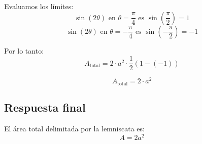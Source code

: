 Evaluamos los límites:
\[
\sin(2\theta) \text{ en } \theta = \frac{\pi}{4} \text{ es } \sin\left(\frac{\pi}{2}\right) = 1
\]
\[
\sin(2\theta) \text{ en } \theta = -\frac{\pi}{4} \text{ es } \sin\left(-\frac{\pi}{2}\right) = -1
\]

Por lo tanto:
\[
A_{\text{total}} = 2 \cdot a^2 \cdot \frac{1}{2} \left(1 - (-1)\right)
\]

\[
A_{\text{total}} = 2 \cdot a^2
\]

\subsection*{Respuesta final}

El área total delimitada por la lemniscata es:
\[
A = 2a^2
\]
